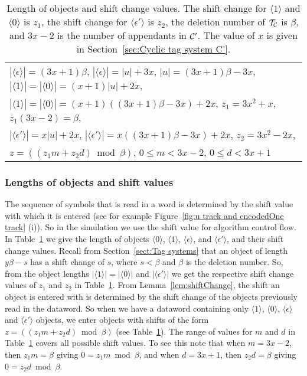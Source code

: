\documentclass[11pt]{article} \usepackage{amsfonts,amsmath,amssymb,amsthm}
\newcommand{\tne}[1]{\ensuremath{\langle #1\rangle}}
\newcommand{\encodeOne}{\tne{1}}
\newcommand{\encodeZero}{\tne{0}}
\newcommand{\encodeDeletion}{\tne{\epsilon}}
\newcommand{\encodeDeletionPrime}{\tne{\epsilon'}}
\begin{document}
\begin{table}
\centering
\begin{tabular}{|@{\:}l@{}|}
\hline
$|\encodeDeletion|=(3x+1)\beta$,\quad\;\; $|\encodeDeletion|=|u|+3x$,\quad\;\; $|u|=(3x+1)\beta-3x$,\quad\;\,  $|\encodeOne|=|\encodeZero|=(x+1)|u|+2x$,
\\  
$|\encodeOne|=|\encodeZero|=(x+1)((3x+1)\beta-3x)+2x$,\qquad\;
$z_1=3x^2+x$,\qquad\; $z_1(3x-2)=\beta$,\quad\\ 
$|\encodeDeletionPrime|=x|u|+2x$,\qquad\;  
$|\encodeDeletionPrime|=x((3x+1)\beta-3x)+2x$,\qquad\; $z_2=3x^2-2x$,\\
$z=((z_1m+z_2d)\bmod\beta)$,\qquad\; $0\leqslant m< 3x-2$,\qquad\; $0\leqslant d< 3x+1$\\
\hline
\end{tabular}
\caption{Length of objects and shift change values. The shift change for $\encodeOne$ and $\encodeZero$ is $z_1$, the shift change for $\encodeDeletionPrime$ is $z_2$, the deletion number of $\mathcal{T_{\mathcal{C}}}$ is $\beta$, and $3x-2$ is the number of appendants in $\mathcal{C}'$. The value of $x$ is given in Section~\ref{sec:Cyclic tag system C'}.}\label{tab:equalities}
\end{table}




\subsubsection{Lengths of objects and shift values}\label{sec:length of objects}
The sequence of symbols that is read in a word is determined by the shift value with which it is entered (see for example Figure~\ref{fig:u track and encodedOne track} (i)).
So in the simulation we use the shift value for algorithm control flow. 
In Table~\ref{tab:equalities} we give the length of objects $\encodeZero$, $\encodeOne$, $\encodeDeletion$, and $\encodeDeletionPrime$, and their shift change values.
Recall from Section~\ref{sect:Tag systems} that an object of length $y\beta-s$ has a shift change of $s$, where $s<\beta$ and $\beta$ is the deletion number. 
So, from the object lengths $|\encodeOne|=|\encodeZero|$ and $|\encodeDeletionPrime|$ we get the respective shift change values of $z_1$ and $z_2$ in Table~\ref{tab:equalities}.
From Lemma~\ref{lem:shiftChange}, the shift an object is entered with is determined by the shift change of the objects previously read in the dataword. 
So when we have a dataword containing only $\encodeOne$, $\encodeZero$, $\encodeDeletion$ and $\encodeDeletionPrime$ objects, we enter objects with shifts of the form $z=((z_1m+z_2d)\bmod\beta)$ (see Table~\ref{tab:equalities}). 
The range of values for $m$ and $d$ in Table~\ref{tab:equalities} covers all possible shift values. 
To see this note that when $m=3x-2$, then  $z_1m=\beta$ giving $0=z_1m\bmod\beta$, and when $d=3x+1$, then $z_2d=\beta$ giving $0=z_2d\bmod\beta$.
\end{document}
